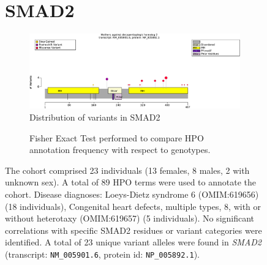 

\begin{figure}[htbp]
    \section*{SMAD2}
\centering
\begin{subfigure}[b]{0.95\textwidth}
\centering
\includegraphics[width=\textwidth]{ img/SMAD2_protein_diagram.pdf} 
\captionsetup{justification=raggedright,singlelinecheck=false}
\caption{Distribution of variants in SMAD2}
\end{subfigure}

\vspace{2em}

\begin{subfigure}[b]{0.95\textwidth}
\centering
{}
\captionsetup{justification=raggedright,singlelinecheck=false}
\caption{Fisher Exact Test performed to compare HPO annotation frequency with respect to genotypes.}
\end{subfigure}

\vspace{2em}

\caption{ The cohort comprised 23 individuals (13 females, 8 males, 2 with unknown sex). A total of 89 HPO terms were used to annotate the cohort. Disease diagnoses: Loeys-Dietz syndrome 6 (OMIM:619656) (18 individuals), Congenital heart defects, multiple types, 8, with or without heterotaxy (OMIM:619657) (5 individuals). No significant correlations with specific SMAD2 residues or variant categories were identified. A total of 23 unique variant alleles were found in \textit{SMAD2} (transcript: \texttt{NM\_005901.6}, protein id: \texttt{NP\_005892.1}).}
\end{figure}

